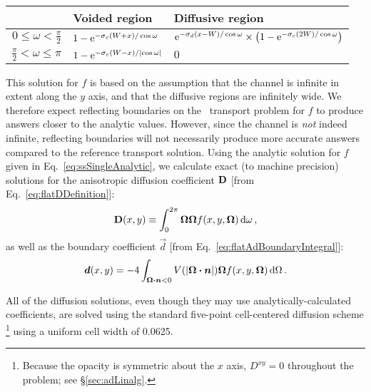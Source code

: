 \begin{table}[htb]
  \centering
  \begin{tabular}{rll}
\toprule
& Voided region & Diffusive region
\\ \midrule
  $0 \le \omega < \frac{\pi}{2}$
&
  $1 - \mathop{}\!\mathrm{e}^{ - \sigma_c (W + x) / \cos \omega}$
& 
  $\mathop{}\!\mathrm{e}^{ - \sigma_d (x - W) / \cos \omega} \times
  \left( 1 - \mathop{}\!\mathrm{e}^{ - \sigma_c (2W) / \cos \omega} \right)
  $
\\
  $\frac{\pi}{2} < \omega \le \pi$
&
  $1 - \mathop{}\!\mathrm{e}^{ - \sigma_c (W - x) / \left|  \cos \omega \right| }$
&
$0$
\\ \bottomrule
  \end{tabular}
  \label{tab:ssSingleAnalytic}
\end{table}

This solution for $f$ is based on the assumption that the channel is
infinite in extent along the $y$ axis, and that the diffusive regions are
infinitely wide. We therefore expect reflecting boundaries on the \SN\ transport
problem for $f$ to produce answers closer to the analytic values. However, since
the channel is \emph{not} indeed infinite, reflecting boundaries will not
necessarily produce more accurate answers compared to the reference transport
solution. Using the analytic solution for $f$ given in
Eq.~\eqref{eq:ssSingleAnalytic}, we calculate exact (to machine precision)
solutions for the anisotropic diffusion coefficient $\mathbf{D}$
[from Eq.~\eqref{eq:flatDDefinition}]:
\begin{equation*}
  \mathbf{D}(x,y) \equiv \int_{0}^{2\pi} \bm{\Omega} \bm{\Omega}
  f(x,y, \bm{\Omega}) \mathop{}\!\mathrm{d}\omega \,,
\end{equation*}
as well as the boundary coefficient $\vec{d}$
[from Eq.~\eqref{eq:flatAdBoundaryIntegral}]:
\begin{equation*}
  \bm{d}(x,y) = -4\int_{\bm{\Omega}\bm{\cdot}\bm{n} < 0}
  V(\left| \bm{\Omega}\bm{\cdot}\bm{n} \right|)
\bm{\Omega} f(x,y, \bm{\Omega}) \mathop{}\!\mathrm{d}\Omega\,.
\end{equation*}

All of the diffusion solutions, even though they may use analytically-calculated
coefficients, are solved using the standard five-point cell-centered diffusion
scheme%
\footnote{%
Because the opacity is symmetric about the $x$ axis, $D^{xy}=0$
throughout the problem; see \S\ref{sec:adLinalg}.
} using a uniform cell width of 0.0625.


